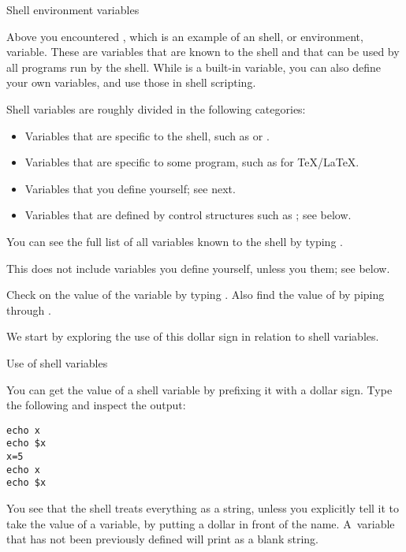 
 {Shell environment variables}
\label{tut:shellvars}

Above you encountered , which is an example of an
shell, or environment, variable. These are variables that are known to the shell
and that can be used by all programs run by the shell.
While  is a built-in variable, you can also define your own
variables, and use those in shell scripting.

Shell variables are roughly divided in the following categories:
\begin{itemize}
\item Variables that are specific to the shell, such as  or .
\item Variables that are specific to some program, such as  for \TeX/\LaTeX.
\item Variables that you define yourself; see next.
\item Variables that are defined by control structures such as ;
  see below.
\end{itemize}

You can see the
full list of all variables known to the shell by typing .
\begin{remark}
  This does not include variables you define yourself, unless you  them;
  see below.
\end{remark}

\begin{exercise}
  Check on the value of the  variable by typing
    . Also find the value of  by piping 
    through .
\end{exercise}

We start by exploring the use of this dollar sign in relation to shell variables.

 {Use of shell variables}

You can get the value of a shell variable by prefixing it with
a dollar sign.
Type the following and inspect the output:
\begin{lstlisting}
echo x
echo $x
x=5
echo x
echo $x
\end{lstlisting}

You see that the shell treats everything as a string, unless you explicitly tell it
to take the value of a variable, by putting a dollar in front of the name.
A~variable that has not been previously defined will print as a blank string.

